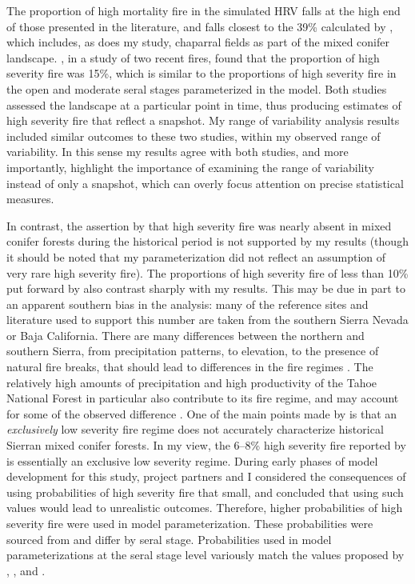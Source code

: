 The proportion of high mortality fire in the simulated HRV falls at the high end of those presented in the literature, and falls closest to the 39\% calculated by \citet{Baker2014}, which includes, as does my study, chaparral fields as part of the mixed conifer landscape. \citet{Collins2010}, in a study of two recent fires, found that the proportion of high severity fire was 15\%, which is similar to the proportions of high severity fire in the open and moderate seral stages parameterized in the model. Both studies assessed the landscape at a particular point in time, thus producing estimates of high severity fire that reflect a snapshot. My range of variability analysis results included similar outcomes to these two studies, within my observed range of variability. In this sense my results agree with both studies, and more importantly, highlight the importance of examining the range of variability instead of only a snapshot, which can overly focus attention on precise statistical measures.

In contrast, the assertion by \citet{Collins2011} that high severity fire was nearly absent in mixed conifer forests during the historical period is not supported by my results (though it should be noted that my parameterization did not reflect an assumption of very rare high severity fire). The proportions of high severity fire of less than 10\% put forward by \citet{Mallek2013} also contrast sharply with my results. This may be due in part to an apparent southern bias in the \citet{Mallek2013} analysis: many of the reference sites and literature used to support this number are taken from the southern Sierra Nevada or Baja California. There are many differences between the northern and southern Sierra, from precipitation patterns, to elevation, to the presence of natural fire breaks, that should lead to differences in the fire regimes \citep{Stephens2015}. The relatively high amounts of precipitation and high productivity of the Tahoe National Forest in particular also contribute to its fire regime, and may account for some of the observed difference \citep{PRISMClimateGroup2004,VanWag2006,Littell2012}. One of the main points made by \citet{Baker2014} is that an \emph{exclusively} low severity fire regime does not accurately characterize historical Sierran mixed conifer forests. In my view, the 6--8\% high severity fire reported by \citet{Mallek2013} is essentially an exclusive low severity regime. During early phases of model development for this study, project partners and I considered the consequences of using probabilities of high severity fire that small, and concluded that using such values would lead to unrealistic outcomes. Therefore, higher probabilities of high severity fire were used in model parameterization. These probabilities were sourced from \citet{Landfire2007} and differ by seral stage. Probabilities used in model parameterizations at the seral stage level variously match the values proposed by \citet{Collins2010}, \citet{Mallek2013}, and \citet{Baker2014}.

